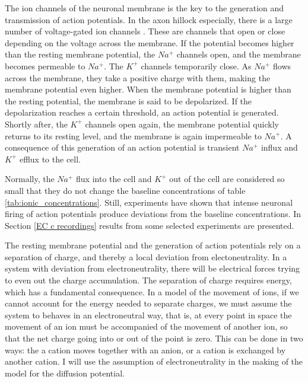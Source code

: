 \documentclass{article}
\begin{document}
The ion channels of the neuronal membrane is the key to the generation and transmission of action potentials. In the axon hillock especially, there is a large number of voltage-gated ion channels \cite{newworldencyclopedia}. These are channels that open or close depending on the voltage across the membrane. If the potential becomes higher than the resting membrane potential, the $Na^+$ channels open, and the membrane becomes permeable to $Na^+$. The $K^+$ channels temporarily close. As $Na^+$ flows across the membrane, they take a positive charge with them, making the membrane potential even higher. When the membrane potential is higher than the resting potential, the membrane is said to be depolarized. If the depolarization reaches a certain threshold, an action potential is generated. Shortly after, the $K^+$ channels open again, the membrane potential quickly returns to its resting level, and the membrane is again impermeable to $Na^+$. A consequence of this generation of an action potential is transient $Na^+$ influx and $K^+$ efflux to the cell. 


Normally, the $Na^+$ flux into the cell and $K^+$ out of the cell are considered so small that they do not change the baseline concentrations of table \ref{tab:ionic_concentrations}. Still, experiments \cite{Dietzel1982}\cite{Nicholson1987}\cite{CordingleySomjen} have shown that intense neuronal firing of action potentials produce deviations from the baseline concentrations. In Section \ref{EC c recordings} results from some selected experiments are presented.


The resting membrane potential and the generation of action potentials rely on a separation of charge, and thereby a local deviation from electoneutrality. In a system with deviation from electroneutrality, there will be electrical forces trying to even out the charge accumulation. The separation of charge requires energy, which has a fundamental consequence. In a model of the movement of ions, if we cannot account for the energy needed to separate charges, we must assume the system to behaves in an electroneutral way, that is, at every point in space the movement of an ion must be accompanied of the movement of another ion, so that the net charge going into or out of the point is zero. This can be done in two ways: the a cation moves together with an anion, or a cation is exchanged by another cation. I will use the assumption of electroneutrality in the making of the model for the diffusion potential.
\end{document}
